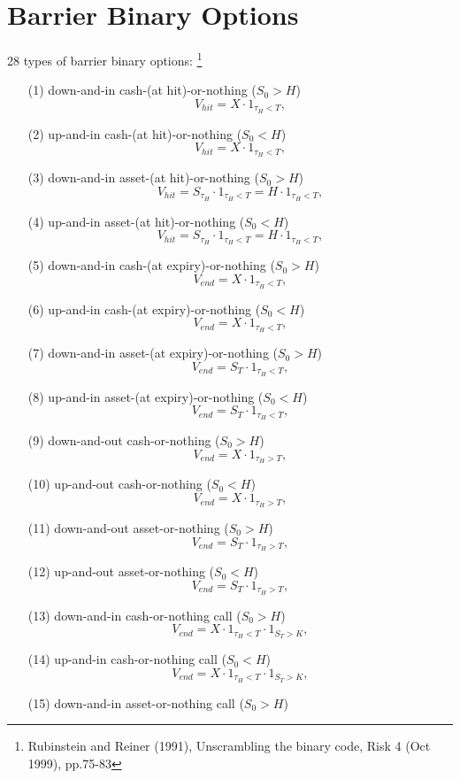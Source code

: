 \section{Barrier Binary Options}

28 types of barrier binary options:
\footnote{Rubinstein and Reiner (1991), Unscrambling the binary code, Risk 4
	(Oct 1999), pp.75-83}

\begin{enumerate}
\item[(1)] down-and-in cash-(at hit)-or-nothing ($S_0>H$)
	\[
		V_{hit} = X \cdot 1_{\tau_H < T},
	\]
\item[(2)] up-and-in cash-(at hit)-or-nothing ($S_0<H$)
	\[
		V_{hit} = X \cdot 1_{\tau_H < T},
	\]
\item[(3)] down-and-in asset-(at hit)-or-nothing ($S_0>H$)
	\[
		V_{hit} = S_{\tau_H} \cdot 1_{\tau_H < T} = H\cdot 1_{\tau_H<T},
	\]
\item[(4)] up-and-in asset-(at hit)-or-nothing ($S_0<H$)
	\[
		V_{hit} = S_{\tau_H} \cdot 1_{\tau_H < T} = H\cdot 1_{\tau_H<T},
	\]
\item[(5)] down-and-in cash-(at expiry)-or-nothing ($S_0>H$)
	\[
		V_{end} = X \cdot 1_{\tau_H < T},
	\]
\item[(6)] up-and-in cash-(at expiry)-or-nothing ($S_0<H$)
	\[
		V_{end} = X \cdot 1_{\tau_H < T},
	\]
\item[(7)] down-and-in asset-(at expiry)-or-nothing ($S_0>H$)
	\[
		V_{end} = S_{T} \cdot 1_{\tau_H < T},
	\]
\item[(8)] up-and-in asset-(at expiry)-or-nothing ($S_0<H$)
	\[
		V_{end} = S_{T} \cdot 1_{\tau_H < T},
	\]
\item[(9)] down-and-out cash-or-nothing ($S_0>H$)
	\[
		V_{end} = X \cdot 1_{\tau_H > T},
	\]
\item[(10)] up-and-out cash-or-nothing ($S_0<H$)
	\[
		V_{end} = X \cdot 1_{\tau_H > T},
	\]
\item[(11)] down-and-out asset-or-nothing ($S_0>H$)
	\[
		V_{end} = S_T \cdot 1_{\tau_H > T},
	\]
\item[(12)] up-and-out asset-or-nothing ($S_0<H$)
	\[
		V_{end} = S_T \cdot 1_{\tau_H > T},
	\]
\item[(13)] down-and-in cash-or-nothing call ($S_0>H$)
	\[
		V_{end} = X \cdot 1_{\tau_H < T} \cdot 1_{S_T>K},
	\]
\item[(14)] up-and-in cash-or-nothing call ($S_0<H$)
	\[
		V_{end} = X \cdot 1_{\tau_H < T} \cdot 1_{S_T>K},
	\]
\item[(15)] down-and-in asset-or-nothing call ($S_0>H$)

\end{enumerate}
